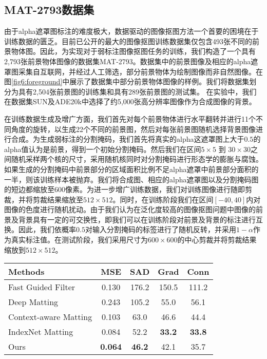 \subsection{MAT-2793数据集}
\label{sec6:data}
由于alpha遮罩图标注的难度极大，数据驱动的图像抠图方法一个首要的困境在于训练数据的匮乏。目前已公开的最大的图像抠图训练数据集\cite{xu2017deep}仅包含493张不同的前景物体图。因此，为实现对于弱标注图像抠图任务的训练，我们构造了一个具有2,793张前景物体图像的数据集MAT-2793。数据集中的前景图像及相应的alpha遮罩图采集自互联网，并经过人工筛选，部分前景物体为绘制图像而非自然图像。在图\ref{fig6:foreground}中展示了数据集中部分前景物体图像的样例。我们将数据集划分为具有2,504张前景图的训练集和具有289张前景图的测试集。
在实验中，我们在数据集SUN\cite{xiao2010sun}及ADE20k\cite{zhou2017scene}中选择了约5,000张高分辨率图像作为合成图像的背景。

在训练数据生成及增广方面，我们首先对每个前景物体进行水平翻转并进行11个不同角度的旋转，以生成22个不同的前景图，然后对每张前景图随机选择背景图像进行合成。为生成弱标注的分割掩码，我们首先将真实的alpha这遮罩图上大于$0.5$的alpha值认为是前景，得到一个初始分割掩码。然后我们在区间$5\times5$ 到 $30\times30$之间随机采样两个核的尺寸，采用随机核同时对分割掩码进行形态学的膨胀与腐蚀。如果生成的分割掩码中前景部分的区域面积比例不足alpha遮罩中前景部分面积的一半，则该训练样本被抛弃。我们将合成图、相应的alpha遮罩图以及分割掩码图的短边都缩放至600像素。为进一步增广训练数据，我们对训练图像进行随即剪裁，并将剪裁结果缩放至$512\times512$。同时，在训练阶段我们在区间$ [-40, 40] $内对图像的色度进行随机扰动。由于我们认为在泛化度较高的图像抠图问题中图像的前景及背景具有一定的可交换性，即我们可以在训练阶段对前景及背景的标注进行互换。因此，我们依概率$0.5$对输入分割掩码的标签进行了随机反转，并采用$1-\alpha$作为真实标注值。在测试阶段，我们采用尺寸为$600\times600$的中心剪裁并将剪裁结果缩放到$512\times512$。

\begin{table}[t]
	\centering
	\begin{tabular}{l@{\qquad}cccc}  
		\toprule
		Methods & MSE & SAD & Grad &Conn\\
		\midrule
		Fast Guided Filter \cite{he2015fast} &  0.130 & 176.2  & 150.5  & 111.2 \\
		Deep Matting \cite{xu2017deep} & 0.243 & 105.2 & 55.0 & 56.1\\
		Context-aware Matting \cite{hou2019context}  & 0.103  & 63.0  & 46.6  & 44.4 \\
		IndexNet Matting \cite{lu2019indices}  & 0.084 & 52.2 & \textbf{33.2} & \textbf{33.8}\\
		Ours & \textbf{0.064} & \textbf{46.2} & {42.1} & {35.7}\\        
		\bottomrule
	\end{tabular}
	\label{tab6:adobe}
\end{table}

